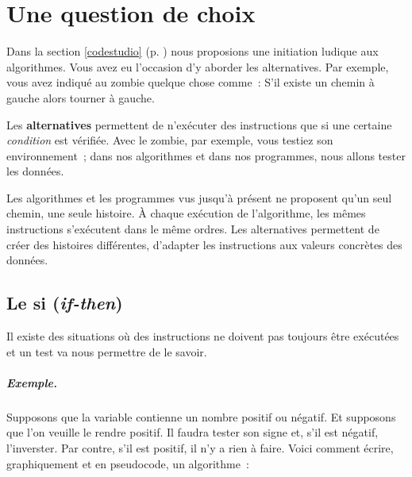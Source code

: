 \chapter{Une question de choix}

	Dans la section \ref{codestudio} (p. \pageref{codestudio}) nous proposions
	une initiation ludique aux algorithmes.  Vous avez eu l’occasion d’y aborder
	les alternatives.  Par exemple, vous avez indiqué au zombie quelque chose
	comme~: \og{}S’il existe un chemin à gauche alors tourner à gauche\fg{}.
	
	Les \textbf{alternatives} permettent de n’exécuter des
	instructions que si une certaine \emph{condition} est vérifiée.  Avec le
	zombie, par exemple, vous testiez son environnement~; dans nos algorithmes
	et dans nos programmes, nous allons tester les données.
	
	Les algorithmes et les programmes vus jusqu’à présent ne proposent qu’un
	seul \og{}chemin\fg{}, une seule \og{}histoire\fg{}.  À chaque exécution de
	l’algorithme, les mêmes instructions s’exécutent dans le même ordres.  Les
	alternatives permettent de créer des histoires différentes, d’adapter les
	instructions aux valeurs concrètes des données.  

	\minitoc 

\section{Le si (\textit{if-then})}
		
	Il existe des situations où des instructions ne doivent pas toujours être
	exécutées et un test va nous permettre de le savoir.
	
	\paragraph{Exemple.}

	Supposons que la variable  contienne un nombre positif ou négatif.
	Et supposons que l’on veuille le rendre positif. Il faudra tester son signe
	et, s’il est négatif, l'inverster.  Par contre, s’il est positif, il n’y
	a rien à faire.  Voici comment écrire, graphiquement et en pseudocode, un 
	algorithme~:
	
